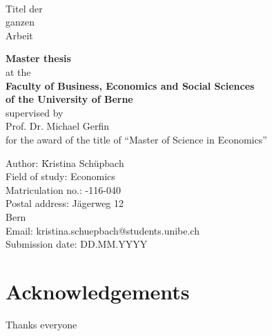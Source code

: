 \documentclass[
]{article}
\author{}
\date{\vspace{-2.5em}}
\newcommand\blankpage{%
    \null
    \thispagestyle{empty}%
    \addtocounter{page}{-1}%
    \newpage}
\begin{document}


\thispagestyle{empty}
\ \vspace{1.0cm}
\begin{center}
{\LARGE
Titel der \\[0.1cm]
ganzen \\[0.1cm]
Arbeit \\[1cm]
}

{
{\bf Master thesis} \\
at the \\[0.5cm]
{\bf Faculty of Business, Economics and Social Sciences} \\
{\bf of the University of Berne} \\[0.5cm]
supervised by \\
Prof. Dr. Michael Gerfin\\
for the award of the title of ``Master of Science in Economics'' \\[2.5cm]
}

\hspace{1cm}\begin{minipage}[h]{20cm}
\begin{tabbing}
Author: \hspace{2cm} \= Kristina Sch\"upbach \\
Field of study: \> Economics \\
Matriculation no.: -116-040 \\
Postal address: \> J\"agerweg 12 \\
 Bern \\
Email: \> kristina.schuepbach@students.unibe.ch \\
Submission date: \> DD.MM.YYYY \\
\end{tabbing}
\end{minipage}
\end{center}
\newpage





\section*{Acknowledgements}
Thanks everyone
\pagebreak
\end{document}
